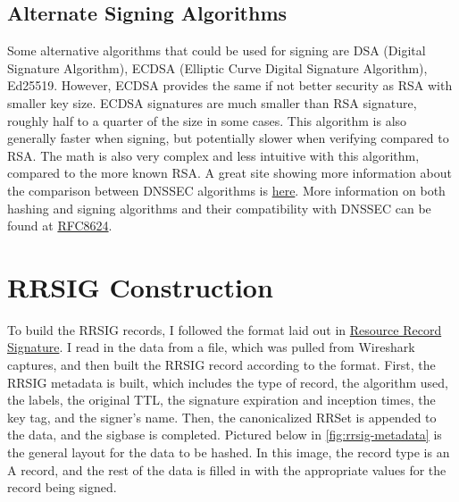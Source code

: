 \subsection{Alternate Signing Algorithms}

Some alternative algorithms that could be used for signing are DSA (Digital Signature Algorithm), ECDSA (Elliptic Curve Digital Signature Algorithm), Ed25519. However, ECDSA provides the same if not better security as RSA with smaller key size. 
ECDSA signatures are much smaller than RSA signature, roughly half to a quarter of the size in some cases. This algorithm is also generally faster when signing, but potentially slower when verifying compared to RSA. The math is also very complex 
and less intuitive with this algorithm, compared to the more known RSA.\cite{ecdsa} 
A great site showing more information about the comparison between DNSSEC algorithms is \href{https://oneuptime.com/blog/post/2026-01-15-choose-dnssec-algorithm-rsa-ecdsa/view}{here}. 
More information on both hashing and signing algorithms and their compatibility with DNSSEC can be found at \href{https://www.rfc-editor.org/rfc/rfc8624#section-3.1}{RFC8624}.




\section{RRSIG Construction}
To build the RRSIG records, I followed the format laid out in \hyperref[subsec:rrsig]{Resource Record Signature}. I read in the data from a file, which was pulled from Wireshark captures, 
and then built the RRSIG record according to the format. First, the RRSIG metadata is built, which includes the type of record, the algorithm used, the labels, the original TTL, the signature 
expiration and inception times, the key tag, and the signer's name. Then, the canonicalized RRSet is appended to the data, and the sigbase is completed. Pictured below in 
\cref{fig:rrsig-metadata} is the general layout for the data to be hashed. In this image, the record type is an A record, and the rest of the data is filled in with the appropriate values for the record being signed.\cite{rfc4034}

